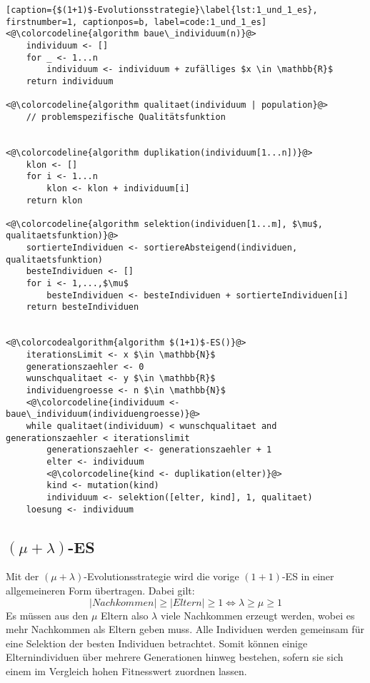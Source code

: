 \begin{lstlisting}[caption={$(1+1)$-Evolutionsstrategie}\label{lst:1_und_1_es}, firstnumber=1, captionpos=b, label=code:1_und_1_es]
<@\colorcodeline{algorithm baue\_individuum(n)}@>
	individuum <- []	
	for _ <- 1...n
		individuum <- individuum + zufälliges $x \in \mathbb{R}$
	return individuum
	
<@\colorcodeline{algorithm qualitaet(individuum | population}@>
	// problemspezifische Qualitätsfunktion

	
<@\colorcodeline{algorithm duplikation(individuum[1...n])}@>
	klon <- []
	for i <- 1...n
		klon <- klon + individuum[i]
	return klon
	
<@\colorcodeline{algorithm selektion(individuen[1...m], $\mu$, qualitaetsfunktion)}@>
	sortierteIndividuen <- sortiereAbsteigend(individuen, qualitaetsfunktion)
	besteIndividuen <- []
	for i <- 1,...,$\mu$
		besteIndividuen <- besteIndividuen + sortierteIndividuen[i]
	return besteIndividuen
	

<@\colorcodealgorithm{algorithm $(1+1)$-ES()}@>
	iterationsLimit <- x $\in \mathbb{N}$
	generationszaehler <- 0
	wunschqualitaet <- y $\in \mathbb{R}$
	individuengroesse <- n $\in \mathbb{N}$
	<@\colorcodeline{individuum <- baue\_individuum(individuengroesse)}@>
	while qualitaet(individuum) < wunschqualitaet and generationszaehler < iterationslimit
		generationszaehler <- generationszaehler + 1
		elter <- individuum
		<@\colorcodeline{kind <- duplikation(elter)}@>
		kind <- mutation(kind)
		individuum <- selektion([elter, kind], 1, qualitaet)
	loesung <- individuum
\end{lstlisting}

\subsection{$(\mu + \lambda)$-ES}

Mit der $(\mu + \lambda)$-Evolutionsstrategie wird die vorige $(1+1)$-ES in einer allgemeineren Form übertragen.
Dabei gilt:
\begin{equation}
|Nachkommen| \ge |Eltern| \ge 1 \Leftrightarrow \lambda \ge \mu \ge 1
\end{equation}
Es müssen aus den $\mu$ Eltern also $\lambda$ viele Nachkommen erzeugt werden, wobei es mehr Nachkommen als Eltern geben muss.
Alle Individuen werden gemeinsam für eine Selektion der besten Individuen betrachtet.
Somit können einige Elternindividuen über mehrere Generationen hinweg bestehen, sofern sie sich einem im Vergleich hohen Fitnesswert zuordnen lassen.

